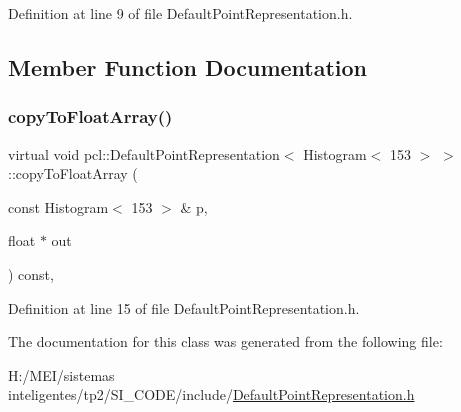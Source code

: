 Definition at line 9 of file Default\+Point\+Representation.\+h.



\subsection{Member Function Documentation}
\mbox{\label{classpcl_1_1_default_point_representation_3_01_histogram_3_01153_01_4_01_4_aa87167229f126da0b0ccff89887875ac}} 
\subsubsection{\texorpdfstring{copy\+To\+Float\+Array()}{copyToFloatArray()}}
{\footnotesize\ttfamily virtual void pcl\+::\+Default\+Point\+Representation$<$ Histogram$<$ 153 $>$ $>$\+::copy\+To\+Float\+Array (\begin{DoxyParamCaption}\item[{const Histogram$<$ 153 $>$ \&}]{p,  }\item[{float $\ast$}]{out }\end{DoxyParamCaption}) const\hspace{0.3cm}{\ttfamily [inline]}, {\ttfamily [virtual]}}



Definition at line 15 of file Default\+Point\+Representation.\+h.



The documentation for this class was generated from the following file\+:\begin{DoxyCompactItemize}
\item 
H\+:/\+M\+E\+I/sistemas inteligentes/tp2/\+S\+I\+\_\+\+C\+O\+D\+E/include/\hyperlink{_default_point_representation_8h}{Default\+Point\+Representation.\+h}\end{DoxyCompactItemize}
